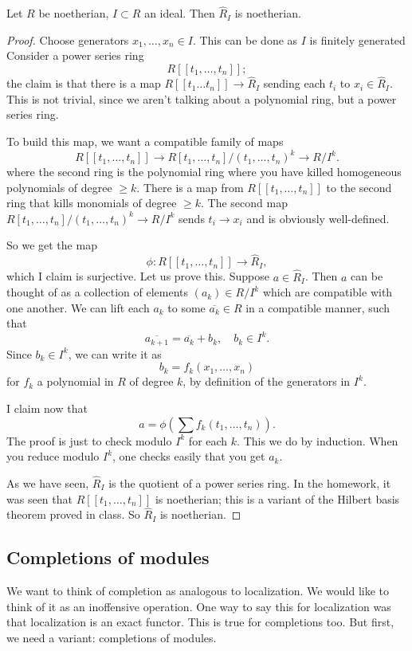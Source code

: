 \begin{proposition} 
Let $R$ be noetherian, $I \subset R$ an ideal. Then $\hat{R}_I$ is noetherian.
\end{proposition} 
\begin{proof} 
Choose generators $x_1, \dots, x_n \in I$. This can be done as $I$ is finitely generated
Consider a power series ring 
\[ R[[t_1, \dots, t_n]] ; \]
the claim is that there is a map $R[[t_1\dots t_n]] \to \hat{R}_I$ sending each
$t_i$ to $x_i  \in \hat{R}_I$. This is not trivial, since we aren't talking
about a polynomial ring, but a power series ring. 

To build this map, we  want a compatible family of maps
\[ R[[t_1, \dots, t_n]] \to R[t_1, \dots, t_n]/(t_1, \dots, t_n)^k  \to R/I^k.  \]
where the second ring is the polynomial ring where you have killed homogeneous
polynomials of degree $\geq k$. There is a map from $R[[t_1, \dots, t_n]]$ to
the second ring that kills monomials of degree $ \geq k$. The second map
$R[t_1, \dots, t_n]/(t_1, \dots, t_n)^k \to R/I^k$ sends $t_i \to x_i$ and is
obviously well-defined.

So we get the map
\[ \phi:  R[[t_1, \dots, t_n]] \to \hat{R}_I ,  \]
which I claim is surjective. Let us prove this. Suppose $a \in \hat{R}_I$. Then $a$ can be thought
of as a collection of elements $(a_k) \in R/I^k$ which are compatible with one
another.  We can lift each $a_k$ to some $\overline{a_k} \in R$ in a
compatible manner, such that
\[ \overline{a_{k+1}} = \overline{a_k} + b_k, \quad b_k \in I^k.  \]
Since $b_k \in I^k$, we can write it as
\[ b_k = f_k(x_1, \dots, x_n)  \]
for $f_k$ a polynomial in $R$ of degree $k$, by definition of the generators in
$I^k$. 

I claim now that 
\[ a = \phi\left( \sum f_k(t_1, \dots, t_n)  \right).  \]
The proof is just to check modulo $I^k$ for each $k$. This we  do by induction.
When you reduce  modulo $I^k$, one checks easily that you get $a_k$.

As we have seen, $\hat{R}_I$ is the quotient of a power series ring. In the
homework, it was seen that $R[[t_1, \dots, t_n]]$ is noetherian; this is a
variant of the Hilbert basis theorem proved in class. So $\hat{R}_I$ is
noetherian.
\end{proof} 


\subsection{Completions of modules}
We want to think of completion as analogous to localization. We would like to
think of it as an inoffensive operation. One way to say this for localization
was that localization is an exact functor. This is true for completions too.
But first, we need a variant: completions of modules.

